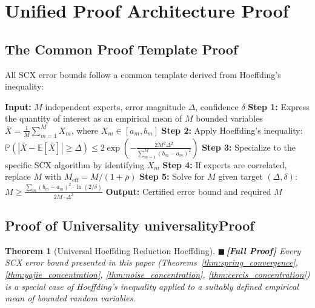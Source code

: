 \documentclass[12pt,a4paper]{article}
\newtheorem{theorem}{Theorem}[section]
\theoremstyle{definition}
\newcommand{\rigorFull}{{\color{rigorcolor}$\blacksquare$\,\textbf{[Full Proof]}}}
\newcommand{\SCX}{\textsc{SCX}}
\newcommand{\E}{\mathbb{E}}
\newcommand{\Pbb}{\mathbb{P}}
\begin{document}
\section{Unified Proof Architecture Proof}
\label{sec:unified_proofs}

\subsection{The Common Proof Template Proof}

All \SCX{} error bounds follow a common template derived from Hoeffding's inequality:

\begin{algorithm}[htbp]
\caption{Universal \SCX{} Error Bound Derivation SCX}
\label{alg:universal_bound}
\begin{algorithmic}[1]
\State \textbf{Input:} $M$ independent experts, error magnitude $\Delta$, confidence $\delta$
\State \textbf{Step 1:} Express the quantity of interest as an empirical mean of $M$ bounded variables
\State \quad $\bar{X} = \frac{1}{M}\sum_{m=1}^{M} X_m$, where $X_m \in [a_m, b_m]$
\State \textbf{Step 2:} Apply Hoeffding's inequality:
\State \quad $\Pbb(|\bar{X} - \E[\bar{X}]| \geq \Delta) \leq 2\exp\!\left(-\frac{2M^2\Delta^2}{\sum_{m=1}^{M} (b_m - a_m)^2}\right)$
\State \textbf{Step 3:} Specialize to the specific \SCX{} algorithm by identifying $X_m$
\State \textbf{Step 4:} If experts are correlated, replace $M$ with $M_{\text{eff}} = M/(1+\bar{\rho})$
\State \textbf{Step 5:} Solve for $M$ given target $(\Delta, \delta)$:
\State \quad $M \geq \frac{\sum_{m} (b_m - a_m)^2 \cdot \ln(2/\delta)}{2M \cdot \Delta^2}$
\State \textbf{Output:} Certified error bound and required $M$
\end{algorithmic}
\end{algorithm}

\subsection{Proof of Universality universalityProof}

\begin{theorem}[Universal Hoeffding Reduction Hoeffding]\label{thm:universal_reduction}
\rigorFull
Every \SCX{} error bound presented in this paper (Theorems~\ref{thm:spring_convergence}, 
\ref{thm:yajie_concentration}, \ref{thm:noise_concentration}, \ref{thm:cercis_concentration}) 
is a special case of Hoeffding's inequality applied to a suitably defined empirical mean 
of bounded random variables.
\end{theorem}
\end{document}
